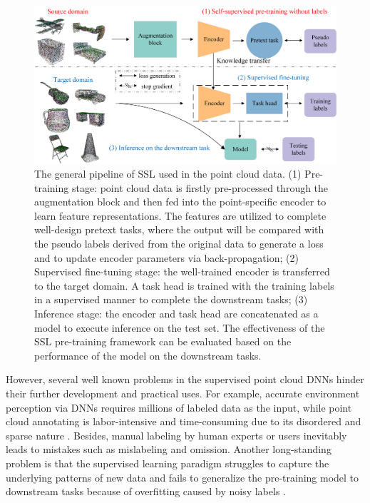\documentclass[a4paper,fleqn]{cas-dc}
\begin{document}
\begin{figure}
    \centering
    \includegraphics[width=0.97\linewidth]{new_pipeline.png}
    \caption{The general pipeline of SSL used in the point cloud data. (1) Pre-training stage: point cloud data is firstly pre-processed through the augmentation block and then fed into the point-specific encoder to learn feature representations. The features are utilized to complete well-design pretext tasks, where the output will be compared with the pseudo labels derived from the original data to generate a loss and to update encoder parameters via back-propagation; (2) Supervised fine-tuning stage: the well-trained encoder is transferred to the target domain. A task head is trained with the training labels in a supervised manner to complete the downstream tasks; (3) Inference stage: the encoder and task head are concatenated as a model to execute inference on the test set. The effectiveness of the SSL pre-training framework can be evaluated based on the performance of the model on the downstream tasks.}
    \label{fig:pipeline}
\end{figure}

However, several well known problems in the supervised point cloud DNNs hinder their further development and practical uses. For example, accurate environment perception via DNNs requires millions of labeled data as the input, while point cloud annotating is labor-intensive and time-consuming due to its disordered and sparse nature \citep{dai2017scannet}. Besides, manual labeling by human experts or users inevitably leads to mistakes such as mislabeling and omission. Another long-standing problem is that the supervised learning paradigm struggles to capture the underlying patterns of new data and fails to generalize the pre-training model to downstream tasks because of overfitting caused by noisy labels \citep{sariyildiz2022improving}.
\end{document}
